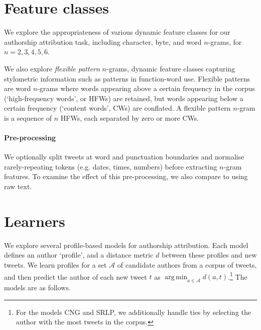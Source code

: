 \documentclass[twocolumn,10pt]{article}
\DeclareMathOperator*{\argmin}{arg\,min}
\begin{document}
\section{Feature classes}
We explore the appropriateness of various dynamic feature
classes for our authorship attribution task, including
character, byte, and word $n$-grams, for $n = 2,3,4,5,6$.

We also explore \emph{flexible pattern} $n$-grams, dynamic
feature classes capturing stylometric information such as
patterns in function-word use\supercite{schwartz2013authorship}.
Flexible patterns are word $n$-grams where words appearing
above a certain frequency in the corpus (`high-frequency words',
or HFWs) are retained, but words appearing below a certain
frequency (`content words', CWs) are conflated. A flexible
pattern $n$-gram is a sequence of $n$ HFWs, each separated
by zero or more CWs.


\paragraph{Pre-processing}
We optionally split tweets at word and punctuation boundaries and
normalise rarely-repeating tokens (e.g. dates, times, numbers)
before extracting $n$-gram features. To examine the effect of
this pre-processing, we also compare to using raw text.


\section{Learners}

We explore several profile-based models for authorship attribution.
Each model defines an author  `profile', and a distance metric $d$
between these profiles and new tweets.
We learn profiles for a set $\mathcal{A}$ of candidate authors from
a corpus of tweets, and then predict the author of each new tweet
$t$ as $\argmin_{a \in \mathcal{A}} d(a, t)$.\footnote{
For the models CNG and SRLP, we additionally handle ties
by selecting the author with the most tweets in the corpus.}
The models are as follows.
\end{document}

